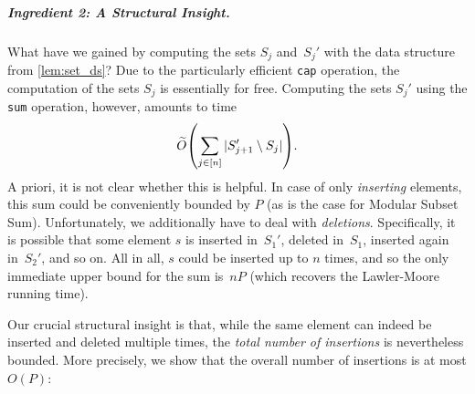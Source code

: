 \documentclass[10pt,a4paper]{article}
\DeclarePairedDelimiter\parens{\lparen}{\rparen}
\newcommand\Order{O}
\newcommand{\Op}[1]{{\normalfont\texttt{#1}}}
\begin{document}
\subparagraph{Ingredient 2: A Structural Insight.}
What have we gained by computing the sets $S_j$ and~$S_j'$ with the data structure from \cref{lem:set_ds}? 
Due to the particularly efficient \Op{cap} operation, the computation of the sets $S_j$ is essentially for free.
Computing the sets $S_j'$ using the \Op{sum} operation, however, amounts to time
\begin{equation*}
    \widetilde\Order\parens*{\sum_{j \in [n]} |S_{j+1}' \setminus S_j|}.
\end{equation*}
A priori, it is not clear whether this is helpful. In case of only \emph{inserting} elements, this sum could be conveniently bounded by $P$ (as is the case for Modular Subset Sum). Unfortunately, we additionally have to deal with \emph{deletions}. Specifically, it is possible that some element $s$ is inserted in~$S_1'$, deleted in~$S_1$, inserted again in~$S_2'$, and so on. All in all, $s$ could be inserted up to $n$ times, and so the only immediate upper bound for the sum is~$nP$ (which recovers the Lawler-Moore running time).

Our crucial structural insight is that, while the same element can indeed be inserted and deleted multiple times, the \emph{total number of insertions} is nevertheless bounded. More precisely, we show that the overall number of insertions is at most $\Order(P)$:
\end{document}
